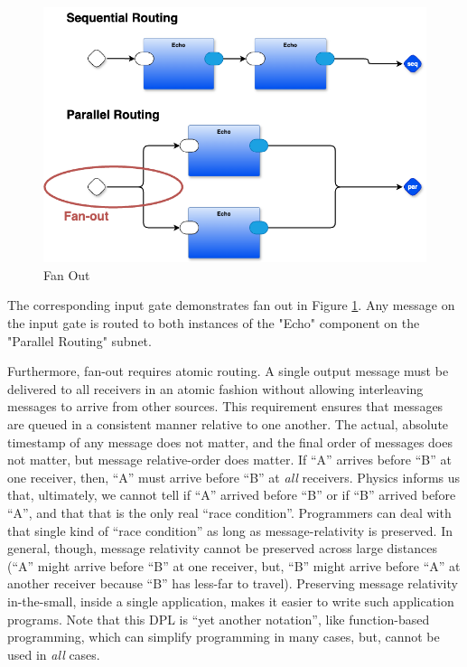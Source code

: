 \documentclass[10pt,anonymous,review]{acmart}
\begin{document}
  \begin{figure}
    \includegraphics[scale=0.2]{./media/fanout.png}
    \caption{Fan Out}
    \label{fanout}
  \end{figure}
The corresponding input gate demonstrates fan out in Figure \ref{fanout}. Any message on the input gate is routed to both instances of the "Echo" component on the "Parallel Routing" subnet.


Furthermore, fan-out requires atomic routing. A single output message must be delivered to all receivers in an atomic fashion without allowing interleaving messages to arrive from other sources. This requirement ensures that messages are queued in a consistent manner relative to one another. The actual, absolute timestamp of any message does not matter, and the final order of messages does not matter, but message relative-order does matter. If “A” arrives before “B” at one receiver, then, “A” must arrive before “B” at \emph{all} receivers. Physics informs us that, ultimately, we cannot tell if “A” arrived before “B” or if “B” arrived before “A”, and that that is the only real “race condition”. Programmers can deal with that single kind of “race condition” as long as message-relativity is preserved. In general, though, message relativity cannot be preserved across large distances (“A” might arrive before “B” at one receiver, but, “B” might arrive before “A” at another receiver because “B” has less-far to travel). Preserving message relativity in-the-small, inside a single application, makes it easier to write such application programs. Note that this DPL is “yet another notation”, like function-based programming, which can simplify programming in many cases, but, cannot be used in \emph{all} cases.
\end{document}
